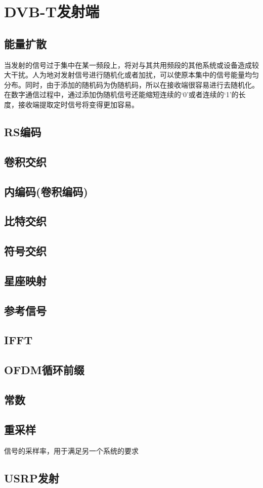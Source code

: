 \chapter{DVB-T发射端}
\section{能量扩散}
	\par 当发射的信号过于集中在某一频段上，将对与其共用频段的其他系统或设备造成较大干扰。人为地对发射信号进行随机化或者加扰，可以使原本集中的信号能量均匀分布。同时，由于添加的随机码为伪随机码，所以在接收端很容易进行去随机化。在数字通信过程中，通过添加伪随机信号还能缩短连续的‘0’或者连续的‘1’的长度，接收端提取定时信号将变得更加容易。

\section{RS编码}
\section{卷积交织}
\section{内编码(卷积编码)}
\section{比特交织}
\section{符号交织}
\section{星座映射}
\section{参考信号}
\section{IFFT}
\section{OFDM循环前缀}
\section{常数}
\section{重采样}
信号的采样率，用于满足另一个系统的要求
\section{USRP发射}
